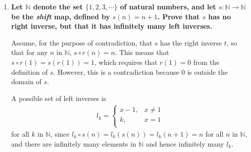 \documentclass[a4paper,12pt]{article}
\begin{document}
\begin{enumerate}
    \item
        \boldmath
        \textbf{Let $\mathbb{N}$ denote the set $\{ 1, 2, 3, \cdots \}$ of natural numbers, and let $s : \mathbb{N} \to \mathbb{N}$ be the \textit{shift} map, defined by $s(n) = n + 1$. Prove that $s$ has no right inverse, but that it has infinitely many left inverses.} \par
        \unboldmath
        Assume, for the purpose of contradiction, that $s$ has the right inverse $t$, so that for any $n$ in $\mathbb{N}$, $s \circ r(n) = n$. This means that $s \circ r(1) = s(r(1)) = 1$, which requires that $r(1) = 0$ from the definition of $s$. However, this is a contradiction because $0$ is outside the domain of $s$. \par
        A possible set of left inverses is
        \begin{align*}
            l_k = \begin{cases}
                x - 1, &x \neq 1 \\
                k, &x = 1 \\
            \end{cases}
        \end{align*}
        for all $k$ in $\mathbb{N}$, since $l_k \circ s(n) = l_k(s(n)) = l_k(n + 1) = n$ for all $n$ in $\mathbb{N}$, and there are infinitely many elements in $\mathbb{N}$ and hence infinitely many $l_k$.
\end{enumerate}
\end{document}
